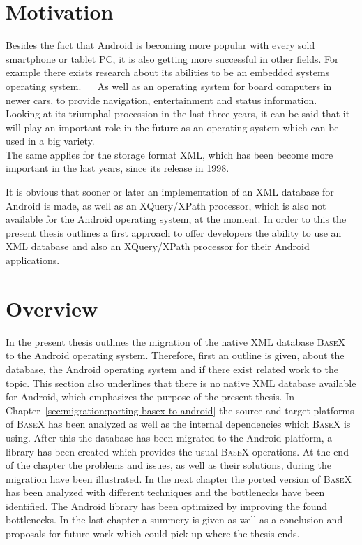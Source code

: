 \section{Motivation}
\label{sec:introduction:motivation}
Besides the fact that Android is becoming more popular with every sold smartphone or tablet PC, it is also getting more successful in other fields.
For example there exists research about its abilities to be an embedded systems operating system. ~\cite{lee2010evaluating}~\cite{maia2010evaluating}
As well as an operating system for board computers in newer cars, to provide navigation, entertainment and status information.~\cite{macario2009vehicle}
Looking at its triumphal procession in the last three years, it can be said that it will play an important role in the future as an operating system which can be used in a big variety.\\
The same applies for the storage format XML, which has been become more important in the last years, since its release in 1998.



It is obvious that sooner or later an implementation of an XML database for Android is made, as well as an XQuery/XPath processor, which is also not available for the Android operating system, at the moment.
In order to this the present thesis outlines a first approach to offer developers the ability to use an XML database and also an XQuery/XPath processor for their Android applications.



\section{Overview}
\label{sec:overview}
In the present thesis outlines the migration of the native XML database \textsc{BaseX} to the Android operating system.
Therefore, first an outline is given, about the database, the Android operating system and if there exist related work to the topic.
This section also underlines that there is no native XML database available for Android, which emphasizes the purpose of the present thesis.
In Chapter~\ref{sec:migration:porting-basex-to-android} the source and target platforms of \textsc{BaseX} has been analyzed as well as the internal dependencies which \textsc{BaseX} is using.
After this the database has been migrated to the Android platform, a library has been created which provides the usual \textsc{BaseX} operations.
At the end of the chapter the problems and issues, as well as their solutions, during the migration have been illustrated.
In the next chapter the ported version of \textsc{BaseX} has been analyzed with different techniques and the bottlenecks have been identified.
The Android library has been optimized by improving the found bottlenecks.
In the last chapter a summery is given as well as a conclusion and proposals for future work which could pick up where the thesis ends.


